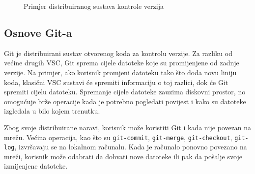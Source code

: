 \begin{figure}[h]

    \caption{Primjer distribuiranog sustava kontrole verzija}%
    \label{fig:02DVCS}
\end{figure}

\subsection{Osnove Git-a}
Git je distribuirani sustav otvorenog koda za kontrolu verzije. Za razliku od većine drugih VSC,
Git sprema cijele datoteke koje su promijenjene od zadnje verzije. Na primjer, ako korisnik promjeni
datoteku tako što doda novu liniju koda, klasični VSC sustavi će spremiti informaciju o toj razlici,
dok će Git spremiti cijelu datoteku. Spremanje cijele datoteke zauzima diskovni prostor, no
omogućuje brže operacije kada je potrebno pogledati povijest i kako su datoteke izgledala u bilo
kojem trenutku.

Zbog svoje distribuirane naravi, korisnik može koristiti Git i kada nije povezan na mrežu. Većina
operacija, kao što su \texttt{git-commit}, \texttt{git-merge}, \texttt{git-checkout},
\texttt{git-log}, izvršavaju se na lokalnom računalu. Kada je računalo ponovno povezano na mreži,
korisnik može odabrati da dohvati nove datoteke ili pak da pošalje svoje izmijenjene datoteke.

